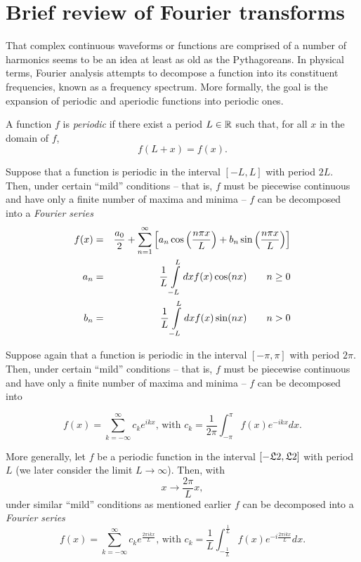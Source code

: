 \chapter{Brief review of Fourier transforms}

That complex continuous waveforms or functions are comprised of a number of harmonics seems to be an idea at least as old as the Pythagoreans.
In physical terms, Fourier analysis \cite{Howell,herman-fa}
attempts to decompose a function into its constituent frequencies, known as a frequency spectrum.
More formally, the goal is the expansion of periodic and aperiodic functions into periodic ones.




A function $f$
is {\em periodic}
if there exist a period $L\in {\Bbb R}$ such that, for all $x$ in the domain of $f$,
\begin{equation}
f(L+x)=f(x).
\end{equation}

Suppose that a function is periodic in the interval $[-L,L]$ with period $2L$.
Then, under certain ``mild'' conditions
-- that is, $f$ must be piecewise continuous and have only a finite number of maxima and minima --
$f$ can be decomposed into a {\em Fourier series}
\begin{eqnarray*}
f(x)&=&{a_0\over2}+\sum_{n=1}^\infty
\left[a_n\cos\left(\frac{n\pi x}{L}\right)+b_n\sin\left(\frac{n\pi x}{L}\right)\right]\\
   a_n&=&{1\over L}\int\limits_{-L}^L dxf(x)\cos(nx)\qquad n\geq0\\
   b_n&=&{1\over L}\int\limits_{-L}^L dxf(x)\sin(nx)\qquad n>0
\end{eqnarray*}





Suppose again that a function is periodic in the interval $[-\pi ,\pi]$ with period $2\pi$.
Then, under certain ``mild'' conditions
-- that is, $f$ must be piecewise continuous and have only a finite number of maxima and minima --
$f$ can be decomposed into

\begin{equation}
f(x)= \sum _{k=-\infty}^\infty c_k e^{ikx} \textrm{, with }
c_k=\frac{1}{2\pi}\int_{-\pi}^\pi f(x) e^{-ikx} dx.
\label{2011-m-fa-e1fc}
\end{equation}

More generally, let $f$ be a periodic function in  the interval $[-\frak{L}{2},\frak{L}{2}]$ with period $L$
(we later consider the limit $L\rightarrow \infty$).
Then, with
$$
x\rightarrow        \frac{2\pi}{L} x,
$$
under similar ``mild'' conditions as mentioned earlier $f$ can be decomposed into a {\em Fourier series}
\begin{equation}
f(x)= \sum _{k=-\infty}^\infty c_k e^{\frac{2\pi ikx}{L}} \textrm{, with }
c_k=\frac{1}{L}\int_{-\frac{1}{L}}^\frac{1}{L} f(x) e^{-i\frac{2\pi ikx}{L}} dx.
\label{2011-m-eft}
\end{equation}


